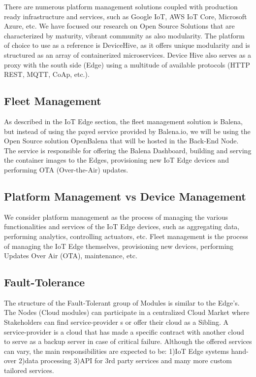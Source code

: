     There are numerous platform management solutions coupled with production ready infrastructure and services, such as Google IoT, AWS IoT Core, Microsoft Azure, etc. We have focused our research on Open Source Solutions that are characterized by maturity, vibrant community as also modularity. The platform of choice to use as a reference is DeviceHive, as it offers unique modularity and is structured as an array of containerized microservices. Device Hive also serves as a proxy with the south side (Edge) using a multitude of available protocols (HTTP REST, MQTT, CoAp, etc.).
    
\subsection{Fleet Management}
As described in the IoT Edge section, the fleet management solution is Balena, but instead of using the payed service provided by Balena.io, we will be using the Open Source solution OpenBalena that will be hosted in the Back-End Node. The service is responsible for offering the Balena Dashboard, building and serving the container images to the Edges, provisioning new IoT Edge devices and performing OTA (Over-the-Air) updates.

\subsection{Platform Management vs Device Management}
We consider platform management as the process of managing the various functionalities and services of the IoT Edge devices, such as aggregating data, performing analytics, controlling actuators, etc. Fleet management is the process of managing the IoT Edge themselves, provisioning new devices, performing Updates Over Air (OTA), maintenance, etc.

\subsection{Fault-Tolerance}
The structure of the Fault-Tolerant group of Modules is similar to the Edge’s. The Nodes (Cloud modules) can participate in a centralized Cloud Market where Stakeholders can find service-provider s or offer their cloud as a Sibling. A service-provider is a cloud that has made a specific contract with another cloud to serve as a backup server in case of critical failure. Although the offered services can vary, the main responsibilities are expected to be: 1)IoT Edge systems hand-over 2)data processing 3)API for 3rd party services and many more custom tailored services.
 
